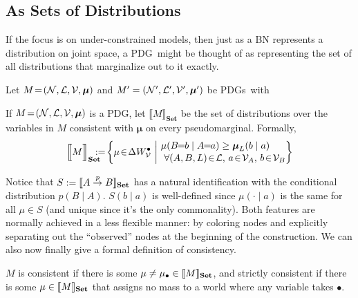 \documentclass{article}
\newcommand\Set{\textbf{Set}}
\newcommand{\MN}{PDG}
\newcommand{\MNs}{\MN s}
\def\seq{\!=\!}
\begin{document}
	\subsection{As Sets of Distributions}\label{sec:set-of-distribution-semantics}
	If the focus is on under-constrained models, then just as a BN represents a distribution on joint space, a \MN\ might be thought of as representing the set of all distributions that marginalize out to it exactly. 
	
	
	\begin{defn}
		Let $M \!=\!\mnvars[]$ and $M'= \mnvars[']$ be \MNs\ with 
	\end{defn}
	

	
	\begin{defn}
		If $M\seq\mnvars[]$ is a \MN, let $\llbracket M \rrbracket_\Set$ be the set of distributions over the variables in $M$ consistent with $\boldsymbol\mu$ on every pseudomarginal. Formally,		
		\[ \Big\llbracket M \Big\rrbracket_\Set \hspace{-2ex} := \!\left\{\mu \!\in\! \Delta W_{\cal V}^\bullet\ \middle|\!
		\begin{array}{l}
		\mu(B\!\! =\!\!b \mid A\!\!=\!\!a) \geq \boldsymbol\mu_L(b \mid a) \\[0.1em]
		~\text{$\forall (A, B, L) \!\in\! \mathcal L$, $a \!\in\!\mathcal V_A$, $b \!\in\! \mathcal V_B$} \end{array}\!\!\! \right\}\]
	\end{defn}
	
	
	Notice that $S := \bbr{
		A \overset{p}{\to} B
	}_\Set$ has a natural identification with 
	the conditional distribution $p( B \mid A)$. $S(b\mid a)$ is well-defined since $\mu(\cdot\mid a)$ is the same for all $\mu \in S$ (and unique since it's the only commonality). Both features are normally achieved in a less flexible manner: by coloring nodes and explicitly separating out the ``observed'' nodes at the beginning of the construction.
	We can also now finally give a formal definition of consistency.
	\begin{defn} \label{def:weak-consistent}
		$M$ is consistent if there is some $\mu \neq \mu_\bullet \in \bbr{M}_\Set$, and strictly consistent if there is some $\mu \in \bbr{M}_\Set$ that assigns no mass to a world where any variable takes $\bullet$.
	\end{defn}
	
\end{document}
